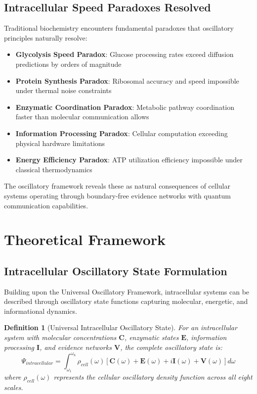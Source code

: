 \documentclass[12pt,a4paper]{article}
\newtheorem{definition}{Definition}
\begin{document}
\subsection{Intracellular Speed Paradoxes Resolved}

Traditional biochemistry encounters fundamental paradoxes that oscillatory principles naturally resolve:

\begin{itemize}
\item \textbf{Glycolysis Speed Paradox}: Glucose processing rates exceed diffusion predictions by orders of magnitude
\item \textbf{Protein Synthesis Paradox}: Ribosomal accuracy and speed impossible under thermal noise constraints
\item \textbf{Enzymatic Coordination Paradox}: Metabolic pathway coordination faster than molecular communication allows
\item \textbf{Information Processing Paradox}: Cellular computation exceeding physical hardware limitations
\item \textbf{Energy Efficiency Paradox}: ATP utilization efficiency impossible under classical thermodynamics
\end{itemize}

The oscillatory framework reveals these as natural consequences of cellular systems operating through boundary-free evidence networks with quantum communication capabilities.

\section{Theoretical Framework}

\subsection{Intracellular Oscillatory State Formulation}

Building upon the Universal Oscillatory Framework, intracellular systems can be described through oscillatory state functions capturing molecular, energetic, and informational dynamics.

\begin{definition}[Universal Intracellular Oscillatory State]
For an intracellular system with molecular concentrations $\mathbf{C}$, enzymatic states $\mathbf{E}$, information processing $\mathbf{I}$, and evidence networks $\mathbf{V}$, the complete oscillatory state is:
\begin{equation}
\Psi_{intracellular} = \int_{\omega_1}^{\omega_8} \rho_{cell}(\omega) [\mathbf{C}(\omega) + \mathbf{E}(\omega) + i\mathbf{I}(\omega) + \mathbf{V}(\omega)] d\omega
\end{equation}
where $\rho_{cell}(\omega)$ represents the cellular oscillatory density function across all eight scales.
\end{definition}
\end{document}
